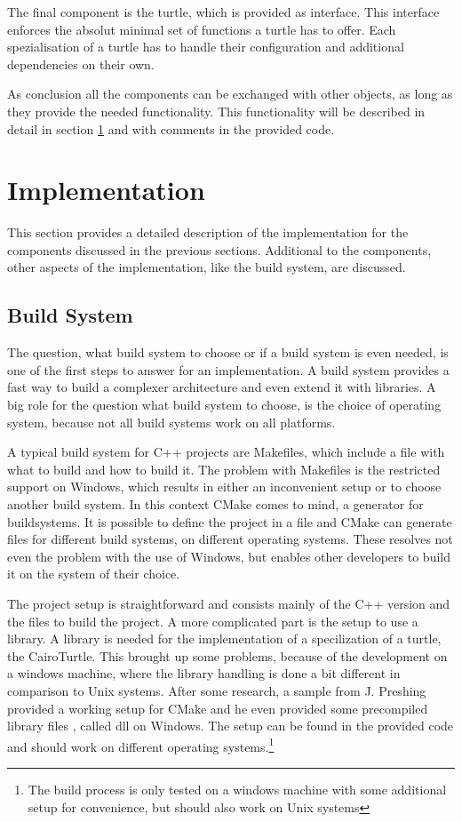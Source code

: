 \documentclass[english]{cpp-hmwk}
\begin{document}
The final component is the turtle, which is provided as interface. This interface enforces the absolut minimal set of functions a turtle has to offer. Each spezialisation of a turtle has to handle their configuration and additional dependencies on their own.

As conclusion all the components can be exchanged with other objects, as long as they provide the needed functionality. This functionality will be described in detail in section \ref{section:impl} and with comments in the provided code.

\clearpage

\section{Implementation}
\label{section:impl}
This section provides a detailed description of the implementation for the components discussed in the previous sections. Additional to the components, other aspects of the implementation, like the build system, are discussed.

\subsection{Build System}
\label{section:buildsystem}
The question, what build system to choose or if a build system is even needed, is one of the first steps to answer for an implementation. A build system provides a fast way to build a complexer architecture and even extend it with libraries. A big role for the question what build system to choose, is the choice of operating system, because not all build systems work on all platforms.
 
A typical build system for C++ projects are Makefiles, which include a file with what to build and how to build it. The problem with Makefiles is the restricted support on Windows, which results in either an inconvenient setup or to choose another build system.
In this context CMake comes to mind, a generator for buildsystems. It is possible to define the project in a file and CMake can generate files for different build systems, on different operating systems. These resolves not even the problem with the use of Windows, but enables other developers to build it on the system of their choice.

The project setup is straightforward and consists mainly of the C++ version and the files to build the project. A more complicated part is the setup to use a library. A library is needed for the implementation of a specilization of a turtle, the CairoTurtle. This brought up some problems, because of the development on a windows machine, where the library handling is done a bit different in comparison to Unix systems. After some research, a sample from J. Preshing \cite{cairoinclude} provided a working setup for CMake and he even provided some precompiled library files \cite{cairodll}, called dll on Windows. 
The setup can be found in the provided code and should work on different operating systems.\footnote{The build process is only tested on a windows machine with some additional setup for convenience, but should also work on Unix systems}
\end{document}
